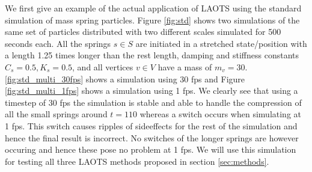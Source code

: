 \documentclass[11pt]{article}
\begin{document}
We first give an example of the actual application of LAOTS using the standard
simulation of mass spring particles. Figure \ref{fig:std} shows two simulations
of the same set of particles distributed with two different scales simulated for
500 seconds each. All the springs $s \in S$ are initiated in a stretched state/position
with a length 1.25 times longer than the rest length, damping and stiffness
constants $C_s = 0.5, K_s = 0.5$, and all vertices $v \in V$
have a mass of $m_v = 30$.
\ref{fig:std_multi_30fps} shows a simulation using 30 fps and Figure
\ref{fig:std_multi_1fps} shows a simulation using 1 fps. We clearly see that
using a timestep of 30 fps the simulation is stable and able to handle the
compression of all the small springs around $t = 110$ whereas a switch occurs
when simulating at 1 fps. This switch causes ripples of sideeffects for the
rest of the simulation and hence the final result is incorrect. No switches of
the longer springs are however occuring and hence these pose no problem at 1
fps. We will use this simulation for testing all three LAOTS methods proposed
in section \ref{sec:methods}.
\end{document}
